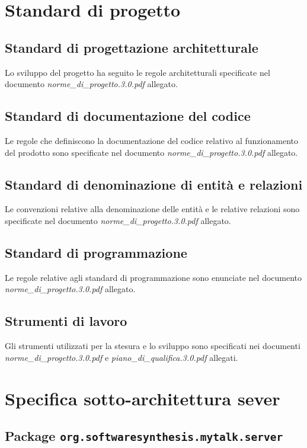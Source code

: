 \section{Standard di progetto}

\subsection{Standard di progettazione architetturale}
Lo sviluppo del progetto ha seguito le regole architetturali specificate nel documento  \textit{norme\_di\_progetto.3.0.pdf} allegato.

\subsection{Standard di documentazione del codice}
Le regole che definiscono la documentazione del codice relativo al funzionamento del prodotto sono specificate nel documento \textit{norme\_di\_progetto.3.0.pdf} allegato.

\subsection{Standard di denominazione di entità e relazioni}
Le convenzioni relative alla denominazione delle entità e le relative relazioni sono specificate nel documento \textit{norme\_di\_progetto.3.0.pdf} allegato.

\subsection{Standard di programmazione}
Le regole relative agli standard di programmazione sono enunciate nel documento \textit{norme\_di\_progetto.3.0.pdf} allegato.

\subsection{Strumenti di lavoro}
Gli strumenti utilizzati per la stesura e lo sviluppo sono specificati nei documenti \textit{norme\_di\_progetto.3.0.pdf} e \textit{piano\_di\_qualifica.3.0.pdf} allegati.

\clearpage

\section{Specifica sotto-architettura sever}\label{sec:serverarchitecture}

\subsection{Package \texttt{org.softwaresynthesis.mytalk.server}}\label{sec:server}

